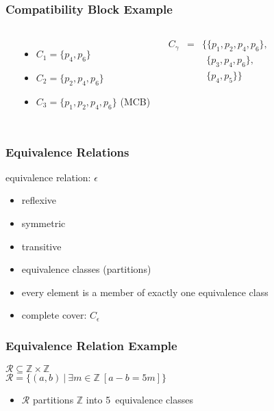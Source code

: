 \documentclass[dvipsnames]{beamer}
\begin{document}
\begin{frame}
  \frametitle{Compatibility Block Example}

  \begin{columns}
    \begin{center}
    \end{center}

    \pause
    \begin{itemize}
      \item $C_1=\{p_4,p_6\}$
      \item $C_2=\{p_2,p_4,p_6\}$
      \item $C_3=\{p_1,p_2,p_4,p_6\}$ (MCB)
    \end{itemize}

    \pause
    \medskip
    \begin{eqnarray*}
      C_\gamma & = & \{\{p_1,p_2,p_4,p_6\},\\
		&   & ~~\{p_3,p_4,p_6\},\\
		&   & ~~\{p_4,p_5\}\}
    \end{eqnarray*}
  \end{columns}
\end{frame}

\begin{frame}
  \frametitle{Equivalence Relations}

  \begin{definition}
    \alert{equivalence relation}: $\epsilon$
    \begin{itemize}
      \item reflexive
      \item symmetric
      \item transitive
    \end{itemize}
  \end{definition}

  \pause
  \begin{itemize}
    \item \alert{equivalence classes (partitions)}
    \item every element is a member of exactly one equivalence class

    \medskip
    \item complete cover: $C_\epsilon$
  \end{itemize}
\end{frame}

\begin{frame}
  \frametitle{Equivalence Relation Example}

  $\mathcal{R} \subseteq \mathbb{Z} \times \mathbb{Z}$\\
  $\mathcal{R} = \{(a,b)~|~\exists m \in \mathbb{Z}~[a - b = 5m]\}$

  \bigskip
  \begin{itemize}
    \item $\mathcal{R}$ partitions $\mathbb{Z}$ into 5~equivalence classes
  \end{itemize}

\end{frame}
\end{document}

